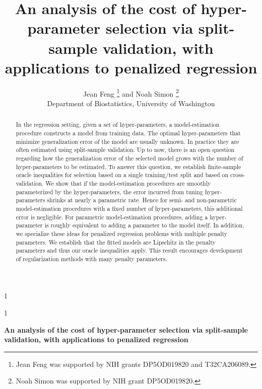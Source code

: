 \documentclass[12pt]{article}
\newcommand{\blind}{1}
\begin{document}
%

\def\spacingset#1{\renewcommand{\baselinestretch}%
{#1}\small\normalsize} \spacingset{1}



\blind
{
  \title{\bf An analysis of the cost of hyper-parameter selection via split-sample validation, with applications to penalized regression}
  \author{Jean Feng \thanks{
    Jean Feng was supported by NIH grants DP5OD019820 and T32CA206089.}\hspace{.2cm}
    and Noah Simon \thanks{
    	Noah Simon was supported by NIH grant DP5OD019820.}\hspace{.2cm}
     \\
    Department of Biostatistics, University of Washington}
  \maketitle
} \fi

\blind
{
  \bigskip
  \bigskip
  \bigskip
  \begin{center}
    {\LARGE\bf An analysis of the cost of hyper-parameter selection via split-sample validation, with applications to penalized regression}
\end{center}
  \medskip
} \fi

\bigskip
\begin{abstract}
In the regression setting, given a set of hyper-parameters, a model-estimation procedure constructs a model from training data. The optimal hyper-parameters that minimize generalization error of the model are usually unknown. In practice they are often estimated using split-sample validation. Up to now, there is an open question regarding how the generalization error of the selected model grows with the number of hyper-parameters to be estimated. To answer this question, we establish finite-sample oracle inequalities for selection based on a single training/test split and based on cross-validation. We show that if the model-estimation procedures are smoothly parameterized by the hyper-parameters, the error incurred from tuning hyper-parameters shrinks at nearly a parametric rate. Hence for semi- and non-parametric model-estimation procedures with a fixed number of hyper-parameters, this additional error is negligible. For parametric model-estimation procedures, adding a hyper-parameter is roughly equivalent to adding a parameter to the model itself. In addition, we specialize these ideas for penalized regression problems with multiple penalty parameters. We establish that the fitted models are Lipschitz in the penalty parameters and thus our oracle inequalities apply. This result encourages development of regularization methods with many penalty parameters.
\end{abstract}
\end{document}

